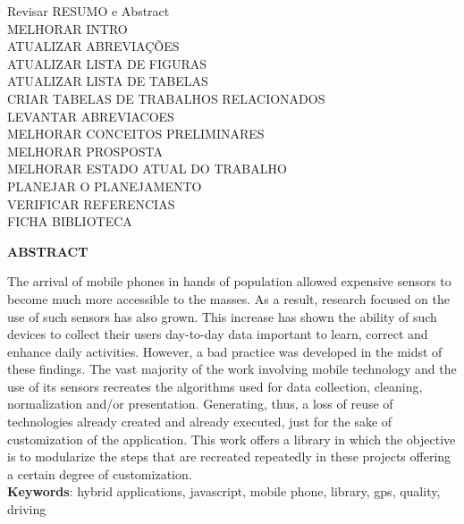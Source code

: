 \documentclass[12pt]{report} %
\begin{document}
	
	Revisar RESUMO e Abstract\\
	MELHORAR INTRO\\
	ATUALIZAR ABREVIAÇÕES\\
	ATUALIZAR LISTA DE FIGURAS\\
	ATUALIZAR LISTA DE TABELAS\\
	CRIAR TABELAS DE TRABALHOS RELACIONADOS\\
	LEVANTAR ABREVIACOES\\
	MELHORAR CONCEITOS PRELIMINARES\\
	MELHORAR PROSPOSTA\\
	MELHORAR ESTADO ATUAL DO TRABALHO\\
	PLANEJAR O PLANEJAMENTO\\
	VERIFICAR REFERENCIAS\\
	FICHA BIBLIOTECA\\
	
	\pagebreak
	
	
	\begin{center}
		{\fontsize{16pt}{\baselineskip}\selectfont \textbf{ABSTRACT}}\\[2em]
	\end{center}
	
	\justifying
	\noindent
	The arrival of mobile phones in hands of population allowed expensive sensors to become much more accessible to the masses. As a result, research focused on the use of such sensors has also grown. This increase has shown the ability of such devices to collect their users day-to-day data important to learn, correct and enhance daily activities. However, a bad practice was developed in the midst of these findings. The vast majority of the work involving mobile technology and the use of its sensors recreates the algorithms used for data collection, cleaning, normalization and/or presentation. Generating, thus, a loss of reuse of technologies already created and already executed, just for the sake of customization of the application. This work offers a library in which the objective is to modularize the steps that are recreated repeatedly in these projects offering a certain degree of customization.
	\\[3em]
	
	\normalsize\noindent
	\textbf{Keywords}: hybrid applications, javascript, mobile phone, library, gps, quality, driving
	
\end{document}
